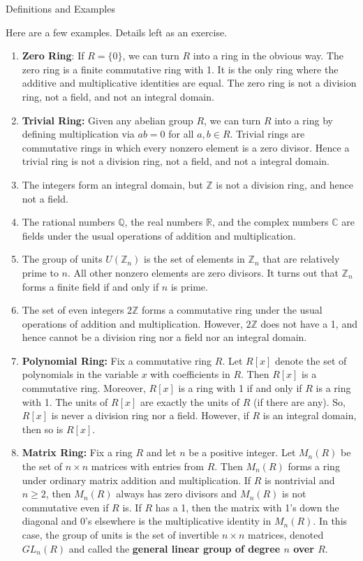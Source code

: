 \begin{section}{Definitions and Examples}
\begin{example}
Here are a few examples.  Details left as an exercise.
\begin{enumerate}[label=\rm{(\alph*)}]
\item \textbf{Zero Ring}: If $R=\{0\}$, we can turn $R$ into a ring in the obvious way.  The zero ring is a finite commutative ring with 1.  It is the only ring where the additive and multiplicative identities are equal.  The zero ring is not a division ring, not a field, and not an integral domain.
\item \textbf{Trivial Ring:} Given any abelian group $R$, we can turn $R$ into a ring by defining multiplication via $ab=0$ for all $a,b\in R$. Trivial rings are commutative rings in which every nonzero element is a zero divisor.  Hence a trivial ring is not a division ring, not a field, and not a integral domain.
\item 
The integers form an integral domain, but $\mathbb{Z}$ is not a division ring, and hence not a field.
\item The rational numbers $\mathbb{Q}$, the real numbers $\mathbb{R}$, and the complex numbers $\mathbb{C}$ are fields under the usual operations of addition and multiplication.
\item 
The group of units $U(\mathbb{Z}_n)$ is the set of elements in $\mathbb{Z}_n$ that are relatively prime to $n$.  All other nonzero elements are zero divisors.  It turns out that $\mathbb{Z}_n$ forms a finite field if and only if $n$ is prime.
\item The set of even integers $2\mathbb{Z}$ forms a commutative ring under the usual operations of addition and multiplication.  However, $2\mathbb{Z}$ does not have a 1, and hence cannot be a division ring nor a field nor an integral domain.
\item \textbf{Polynomial Ring:} Fix a commutative ring $R$.  Let $R[x]$ denote the set of polynomials in the variable $x$ with coefficients in $R$.  Then $R[x]$ is a commutative ring. Moreover, $R[x]$ is a ring with 1 if and only if $R$ is a ring with 1. The units of $R[x]$ are exactly the units of $R$ (if there are any). So, $R[x]$ is never a division ring nor a field.  However, if $R$ is an integral domain, then so is $R[x]$. 
\item \textbf{Matrix Ring:} Fix a ring $R$ and let $n$ be a positive integer.  Let $M_n(R)$ be the set of $n\times n$ matrices with entries from $R$.  Then $M_n(R)$ forms a ring under ordinary matrix addition and multiplication.  If $R$ is nontrivial and $n\geq 2$, then $M_n(R)$ always has zero divisors and $M_n(R)$ is not commutative even if $R$ is.  If $R$ has a 1, then the matrix with 1's down the diagonal and 0's elsewhere is the multiplicative identity in $M_n(R)$.  In this case, the group of units is the set of invertible $n\times n$ matrices, denoted $GL_n(R)$ and called the \textbf{general linear group of degree $n$ over $R$}.

\end{enumerate}
\end{example}
\end{section}
